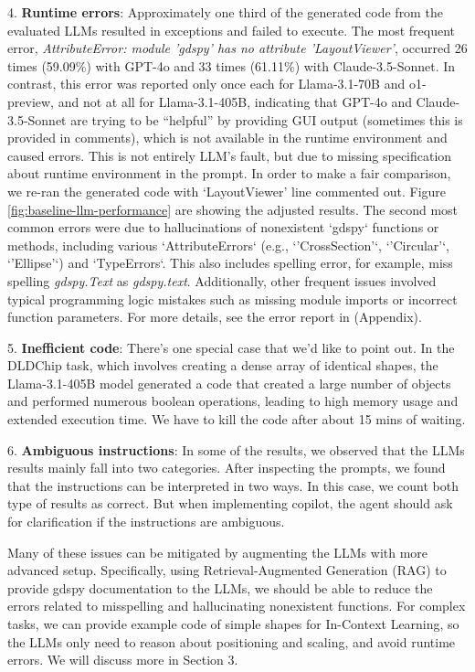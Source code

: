 \documentclass{article}
\begin{document}
  4. \textbf{Runtime errors}: Approximately one third of the generated code from the evaluated LLMs resulted in exceptions and failed to execute. The most frequent error, \textit{AttributeError: module 'gdspy' has no attribute 'LayoutViewer'}, occurred 26 times (59.09\%) with GPT-4o and 33 times (61.11\%) with Claude-3.5-Sonnet. In contrast, this error was reported only once each for Llama-3.1-70B and o1-preview, and not at all for Llama-3.1-405B, indicating that GPT-4o and Claude-3.5-Sonnet are trying to be ``helpful'' by providing GUI output (sometimes this is provided in comments), which is not available in the runtime environment and caused errors. This is not entirely LLM's fault, but due to missing specification about runtime environment in the prompt. In order to make a fair comparison, we re-ran the generated code with `LayoutViewer' line commented out. Figure \ref{fig:baseline-llm-performance} are showing the adjusted results. The second most common errors were due to hallucinations of nonexistent `gdspy` functions or methods, including various `AttributeErrors` (e.g., `'CrossSection'`, `'Circular'`, `'Ellipse'`) and `TypeErrors`. This also includes spelling error, for example, miss spelling \textit{gdspy.Text} as \textit{gdspy.text}. Additionally, other frequent issues involved typical programming logic mistakes such as missing module imports or incorrect function parameters. For more details, see the error report in (Appendix).
  
  5. \textbf{Inefficient code}: There's one special case that we'd like to point out. In the DLDChip task, which involves creating a dense array of identical shapes, the Llama-3.1-405B model generated a code that created a large number of objects and performed numerous boolean operations, leading to high memory usage and extended execution time. We have to kill the code after about 15 mins of waiting. 

  6. \textbf{Ambiguous instructions}: In some of the results, we observed that the LLMs results mainly fall into two categories. After inspecting the prompts, we found that the instructions can be interpreted in two ways. In this case, we count both type of results as correct. But when implementing copilot, the agent should ask for clarification if the instructions are ambiguous.

Many of these issues can be mitigated by augmenting the LLMs with more advanced setup. Specifically, using Retrieval-Augmented Generation (RAG) to provide gdspy documentation to the LLMs, we should be able to reduce the errors related to misspelling and hallucinating nonexistent functions. For complex tasks, we can provide example code of simple shapes for In-Context Learning, so the LLMs only need to reason about positioning and scaling, and avoid runtime errors. We will discuss more in Section 3.
\end{document}
